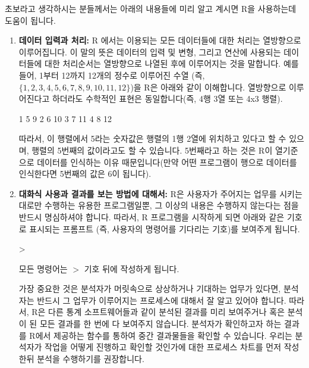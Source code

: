 \documentclass{book}
\begin{document}
초보라고 생각하시는 분들께서는 아래의 내용들에 미리 알고 계시면 R을 사용하는데 도움이 됩니다.

\begin{enumerate}
  \item  \textbf{데이터 입력과 처리:}  R 에서는 이용되는 모든 데이터들에 대한 처리는 열방향으로 이루어집니다.
이 말의 뜻은 데이터의 입력 및 변형, 그리고 연산에 사용되는 데이터들에 대한 처리순서는 열방향으로 나열된 후에 이루어지는 것을 말합니다. 
예를들어, 1부터 12까지 12개의 정수로 이루어진 수열 (즉, $\{ 1, 2, 3, 4, 5, 6, 7, 8, 9, 10, 11, 12 \}$)을 R은 아래와 같이 이해합니다. 
열방향으로 이루어진다고 하더라도 수학적인 표현은 동일합니다(즉, 4행 3열 또는 4x3 행렬).


\begin{Schunk}
\begin{Soutput}
1  5   9
2  6  10
3  7  11
4  8  12
\end{Soutput}
\end{Schunk}

따라서, 이 행렬에서 5라는 숫자값은 행렬의 1행 2열에 위치하고 있다고 할 수 있으며, 행렬의 5번째의 값이라고도 할 수 있습니다. 5번째라고 하는 것은 R이 열기준으로 데이터를 인식하는 이유 때문입니다(만약 어떤 프로그램이 행으로 데이터를 인식한다면 5번째의 값은 6이 됩니다). 

  \item  \textbf{대화식 사용과 결과를 보는 방법에 대해서:} R은 사용자가 주어지는 업무를 시키는 대로만 수행하는 유용한 프로그램일뿐, 그 이상의 내용은 수행하지 않는다는 점을 반드시 명심하셔야 합니다. 
따라서, R 프로그램을 시작하게 되면 아래와 같은 기호로 표시되는 프롬프트 (즉, 사용자의 명령어를 기다리는 기호)를 보여주게 됩니다. 
\begin{Schunk}
\begin{Soutput}
>
\end{Soutput}
\end{Schunk}

모든 명령어는 $>$ 기호 뒤에 작성하게 됩니다. 

가장 중요한 것은 분석자가 머릿속으로 상상하거나 기대하는 업무가 있다면, 분석자는 반드시 그 업무가 이루어지는 프로세스에 대해서 잘 알고 있어야 합니다.
따라서, R은 다른 통계 소프트웨어들과 같이 분석된 결과를 미리 보여주거나 혹은 분석이 된 모든 결과를 한 번에 다 보여주지 않습니다.
분석자가 확인하고자 하는 결과를 R에서 제공하는 함수를 통하여 중간 결과물들을 확인할 수 있습니다. 
우리는 분석자가 작업을 어떻게 진행하고 확인할 것인가에 대한 프로세스 차트를 먼저 작성한뒤 분석을 수행하기를 권장합니다.



\end{enumerate}
\end{document}
